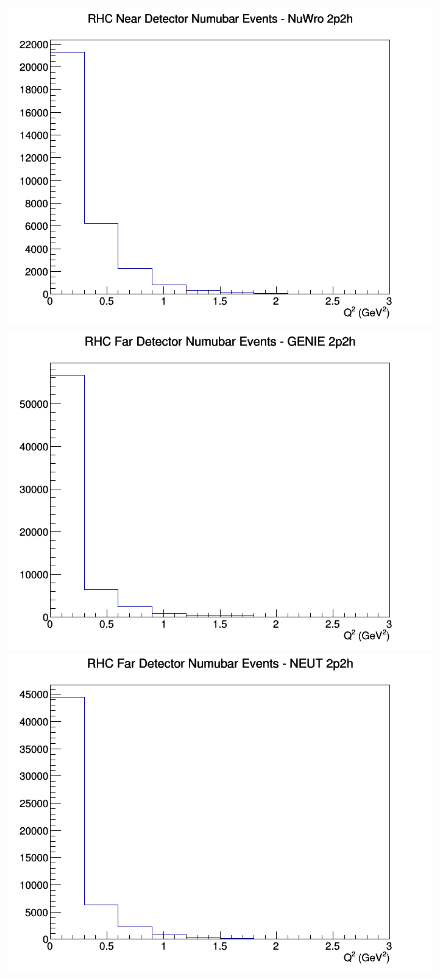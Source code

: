 \begin{figure}[h]
\includegraphics[width=\linewidth]{eff_Q2/FGT/2p2h_RHC_ND_numubar_Q2_NuWro.png}
\endminipage
\newline
{}
\includegraphics[width=\linewidth]{eff_Q2/FGT/2p2h_RHC_FD_numubar_Q2_GENIE.png}
\endminipage
{}
\includegraphics[width=\linewidth]{eff_Q2/FGT/2p2h_RHC_FD_numubar_Q2_NEUT.png}

\end{figure}
